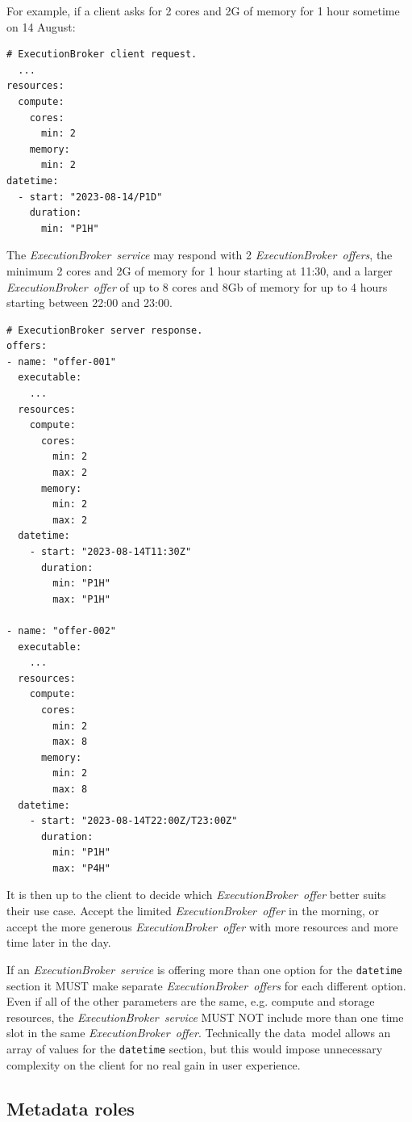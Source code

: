 \documentclass[11pt,a4paper]{ivoa}
\newcommand{\datamodel} {data~model}
\newcommand{\execbrokerservice}[1] {\textit{ExecutionBroker~service#1}}
\newcommand{\execoffer}[1] {\textit{ExecutionBroker~offer#1}}
\newcommand{\codeword}[1] {\texttt{#1}}
\begin{document}
For example, if a client asks for 2 cores and 2G of memory for 1 hour sometime on 14 August:
\begin{lstlisting}[]
# ExecutionBroker client request.
  ...
resources:
  compute:
    cores:
      min: 2
    memory:
      min: 2
datetime:
  - start: "2023-08-14/P1D"
    duration:
      min: "P1H"
\end{lstlisting}

The  \execbrokerservice{} may respond with 2 \execoffer{s},
the minimum 2 cores and 2G of memory for 1 hour starting at 11:30,
and a larger \execoffer{} of up to 8 cores and 8Gb of memory for up to 4 hours
starting between 22:00 and 23:00.

\begin{lstlisting}[]
# ExecutionBroker server response.
offers:
- name: "offer-001"
  executable:
    ...
  resources:
    compute:
      cores:
        min: 2
        max: 2
      memory:
        min: 2
        max: 2
  datetime:
    - start: "2023-08-14T11:30Z"
      duration:
        min: "P1H"
        max: "P1H"

- name: "offer-002"
  executable:
    ...
  resources:
    compute:
      cores:
        min: 2
        max: 8
      memory:
        min: 2
        max: 8
  datetime:
    - start: "2023-08-14T22:00Z/T23:00Z"
      duration:
        min: "P1H"
        max: "P4H"
\end{lstlisting}

It is then up to the client to decide which \execoffer{} better suits their use case.
Accept the limited \execoffer{} in the morning, or accept the more generous \execoffer{} with
more resources and more time later in the day.

If an \execbrokerservice{} is offering more than one option for the \codeword{datetime}
section it MUST make separate \execoffer{s} for each different option.
Even if all of the other parameters are the same, e.g. compute and storage resources, the
\execbrokerservice{} MUST NOT include more than one time slot in the same \execoffer{}.
Technically the \datamodel{} allows an array of values for the \codeword{datetime} section,
but this would impose unnecessary complexity on the client for no real gain in user experience.




\subsection{Metadata roles}
\label{sub-metadata-roles}
\end{document}
